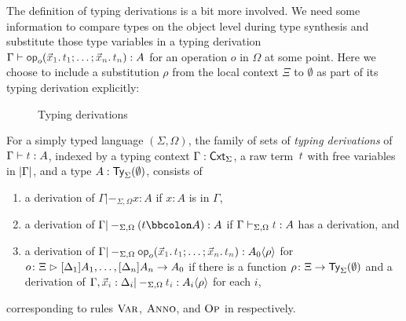 The definition of typing derivations is a bit more involved.
We need some information to compare types on the object level during type synthesis and substitute those type variables in a typing derivation $\Gamma \vdash \tmOpts : A$ for an operation $o$ in $\Omega$ at some point.
Here we choose to include a substitution $\rho$ from the local context $\Xi$ to $\emptyset$ as part of its typing derivation explicitly:

\begin{definition}\label{def:typing-derivations}
  \begin{figure}
    \centering
    \small
    \caption{Typing derivations}
    \label{fig:extrinsic-typing}
  \end{figure}
  For a simply typed language $(\Sigma, \Omega)$, the family of sets of \emph{typing derivations} of $\Gamma \vdash \isTerm{t} : A$, indexed by a typing context $\Gamma : \mathsf{Cxt}_\Sigma$, a raw term~$\isTerm{t}$ with free variables in $\left|\Gamma\right|$, and a type $A : \mathsf{Ty}_\Sigma(\emptyset)$, consists of 
  \begin{enumerate}
    \item a derivation of $\Gamma |-_{\Sigma, \Omega} x : A$ if $x : A$ is in $\Gamma$,
    \item a derivation of $\Gamma |-_{\Sigma, \Omega} (t \annotate A) : A$ if $\Gamma \vdash_{\Sigma, \Omega} \isTerm{t} : A$ has a derivation, and
    \item a derivation of $\Gamma |-_{\Sigma, \Omega} \tmOpts : \simsub{A_0}{\rho}$ for $o\colon \Xi \mathrel{\rhd} [\Delta_{1}]A_{1}, \ldots, [\Delta_{n}]A_{n} \to A_0$ if there is a function $\rho\colon \Xi \to \mathsf{Ty}_{\Sigma}(\emptyset)$ and a derivation of $\Gamma, \vars{x}_{\isTerm{i}} : \Delta_i |-_{\Sigma, \Omega} \isTerm{t_i} : \simsub{A_i}{\rho}$ for each $i$,
  \end{enumerate}
  corresponding to rules $\textnormal{\textsc{Var}}$, $\textnormal{\textsc{Anno}}$, and $\textnormal{\textsc{Op}}$ in  respectively.
\end{definition}

